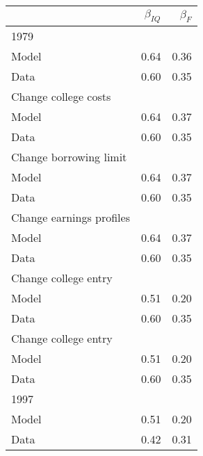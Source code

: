 \begin{tabular}{lrr}
\hline
  & $\beta_{IQ}$  & $\beta_{F}$  \\ 
\hline
1979 &   &   \\ 
Model & 0.64  & 0.36  \\ 
Data & 0.60  & 0.35  \\ 
Change college costs &   &   \\ 
Model & 0.64  & 0.37  \\ 
Data & 0.60  & 0.35  \\ 
Change borrowing limit &   &   \\ 
Model & 0.64  & 0.37  \\ 
Data & 0.60  & 0.35  \\ 
Change earnings profiles &   &   \\ 
Model & 0.64  & 0.37  \\ 
Data & 0.60  & 0.35  \\ 
Change college entry &   &   \\ 
Model & 0.51  & 0.20  \\ 
Data & 0.60  & 0.35  \\ 
Change college entry &   &   \\ 
Model & 0.51  & 0.20  \\ 
Data & 0.60  & 0.35  \\ 
1997 &   &   \\ 
Model & 0.51  & 0.20  \\ 
Data & 0.42  & 0.31  \\ 
\hline
\end{tabular}%
